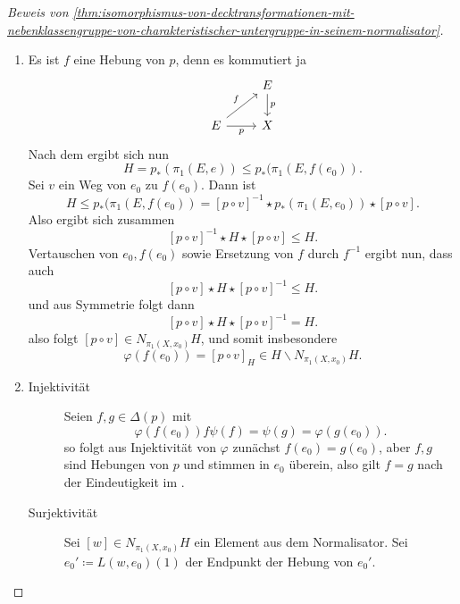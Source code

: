 \begin{proof}[Beweis von \autoref{thm:isomorphismus-von-decktransformationen-mit-nebenklassengruppe-von-charakteristischer-untergruppe-in-seinem-normalisator}]
    \begin{enumerate}[1)]
        \item Es ist $f$ eine Hebung von  $p$, denn es kommutiert ja
            \[
             \begin{tikzcd}
                & E \ar{d}{p} \\
                 E \ar{ur}{f} \ar[swap]{r}{p} & X
            \end{tikzcd}
        \]
    Nach dem  ergibt sich nun
    \[
        H = p_*(\pi_1(E,e)) \leq  p_*(\pi_1(E,f(e_0))
    .\] 
    Sei $v$ ein Weg von  $e_0$ zu $f(e_0)$. Dann ist
    \[
        H\leq p_*(\pi_1(E,f(e_0)) = [p \circ  v] ^{-1} \star p_*(\pi_1(E,e_0)) \star [p \circ  v]
    .\]
    Also ergibt sich zusammen
    \[
        [p \circ  v] ^{-1} \star H \star [p \circ  v] \leq H
    .\] 
    Vertauschen von $e_0,f(e_0)$ sowie Ersetzung von $f$ durch  $f^{-1}$ ergibt nun, dass auch
    \[
        [p \circ  v] \star H \star [p \circ v] ^{-1} \leq H
    .\] 
    und aus Symmetrie folgt dann
    \[
        [p \circ  v] \star H \star [p \circ  v] ^{-1} = H
    .\] 
    also folgt $[p \circ v] \in N_{\pi_1(X,x_0)} H$, und somit insbesondere
    \[
        \varphi (f(e_0)) = [p \circ  v]_H \in H \backslash N_{\pi_1(X,x_0)} H
    .\] 
\item
    \begin{description}
        \item[Injektivität] Seien $f,g \in \Delta(p)$ mit
            \[
                \varphi (f(e_0)) f \psi (f) = \psi (g) = \varphi (g(e_0))
            .\] 
            so folgt aus Injektivität von $\varphi $ zunächst $f(e_0) = g(e_0)$, aber $f,g$ sind Hebungen von  $p$ und stimmen in  $e_0$ überein, also gilt $f=g$ nach der Eindeutigkeit im  .
        \item[Surjektivität] Sei $[w] \in N_{\pi_1(X,x_0)}H$ ein Element aus dem Normalisator. Sei $e_0' \coloneqq  L(w,e_0)(1)$ der Endpunkt der Hebung von $e_0'$.


\end{description}
\end{enumerate}
\end{proof}
